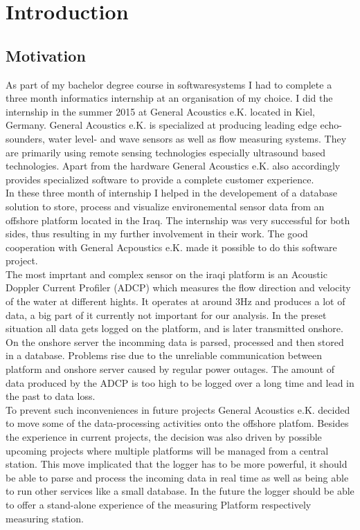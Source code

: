 \chapter{Introduction}

\section{Motivation}
As part of my bachelor degree course in softwaresystems I had to complete a three month informatics internship at an organisation of my choice. I did the internship in the summer 2015 at General Acoustics e.K. located in Kiel, Germany. General Acoustics e.K. is specialized at producing leading edge echo-sounders, water level- and wave sensors as well as flow measuring systems. They are primarily using remote sensing technologies especially ultrasound based technologies. Apart from the hardware General Acoustics e.K. also accordingly provides specialized software to provide a complete customer experience.\\
In these three month of internship I helped in the developement of a database solution to store, process and visualize environemental sensor data from an offshore platform located in the Iraq. The internship was very successful for both sides, thus resulting in my further involvement in their work. The good cooperation with General Acpoustics e.K. made it possible to do this software project.\\\newline%
The most imprtant and complex sensor on the iraqi platform is an Acoustic Doppler Current Profiler (ADCP) which measures the flow direction and velocity of the water at different hights. It operates at around 3Hz and produces a lot of data, a big part of it currently not important for our analysis. In the preset situation all data gets logged on the platform, and is later transmitted onshore. On the onshore server the incomming data is parsed, processed and then stored in a database. Problems rise due to the unreliable communication between platform and onshore server caused by regular power outages. The amount of data produced by the ADCP is too high to be logged over a long time and lead in the past to data loss.\\\newline
To prevent such inconveniences in future projects General Acoustics e.K. decided to move some of the data-processing activities onto the offshore platfom. Besides the experience in current projects, the decision was also driven by possible upcoming projects where multiple platforms will be managed from a central station. This move implicated that the logger has to be more powerful, it should be able to parse and process the incoming data in real time as well as being able to run other services like a small database. In the future the logger should be able to offer a stand-alone experience of the measuring Platform respectively measuring station.\\\newline
